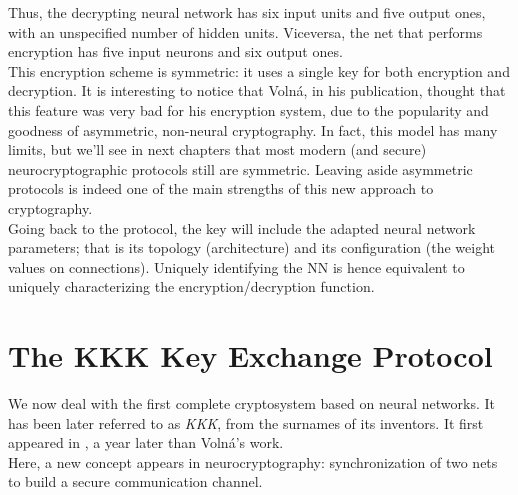 \documentclass[%
    corpo=11pt,
    twoside,
    stile=classica,
    oldstyle,
    autoretitolo,
    tipotesi=magistrale,
    greek,
    evenboxes,
    english
]{toptesi}
\begin{document}
Thus, the decrypting neural network has six input units and five output ones, with an unspecified number of hidden units. Viceversa, the net that performs encryption has five input neurons and six output ones. \\
This encryption scheme is symmetric: it uses a single key for both encryption and decryption. It is interesting to notice that Volná, in his publication, thought that this feature was very bad for his encryption system, due to the popularity and goodness of asymmetric, non-neural cryptography. In fact, this model has many limits, but we'll see in next chapters that most modern (and secure) neurocryptographic protocols still are symmetric. Leaving aside asymmetric protocols is indeed one of the main strengths of this new approach to cryptography. \\
Going back to the protocol, the key will include the adapted neural network parameters; that is its topology (architecture) and its configuration (the weight values on connections). Uniquely identifying the NN is hence equivalent to uniquely characterizing the encryption/decryption function.

\newpage

\section{The KKK Key Exchange Protocol}
We now deal with the first complete cryptosystem based on neural networks. It has been later referred to as \textit{KKK}, from the surnames of its inventors. It first appeared in \cite{kanter}, a year later than Volná's work. \\
Here, a new concept appears in neurocryptography: synchronization of two nets to build a secure communication channel.
\end{document}
